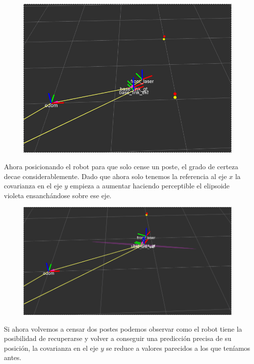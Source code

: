 \begin{figure}[!htb]
\begin{center}
\includegraphics[scale=0.3]{punto4/ekfViendoDosPostes.png}
\end{center}
\end{figure}
\FloatBarrier


Ahora posicionando el robot para que solo cense un poste, el grado de certeza decae considerablemente. Dado que ahora solo tenemos la referencia al eje $x$ la covarianza en el eje $y$ empieza a aumentar haciendo perceptible el elipsoide violeta ensanchándose sobre ese eje.

\begin{figure}[!htb]
\begin{center}
\includegraphics[scale=0.3]{punto4/ekfViendoUnPoste.png}
\end{center}
\end{figure}
\FloatBarrier

Si ahora volvemos a censar dos postes podemos observar como el robot tiene la posibilidad de recuperarse y volver a conseguir una predicción precisa de su posición, la covarianza en el eje $y$ se reduce a valores parecidos a los que teníamos antes.


